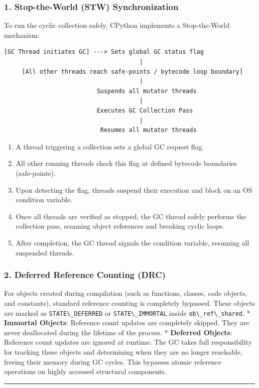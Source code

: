\hypertarget{stop-the-world-stw-synchronization}{%
\subsubsection{1. Stop-the-World (STW)
Synchronization}\label{stop-the-world-stw-synchronization}}

To run the cyclic collection safely, CPython implements a Stop-the-World
mechanism:

\begin{lstlisting}
[GC Thread initiates GC] ---> Sets global GC status flag
                                      |
     [All other threads reach safe-points / bytecode loop boundary]
                                      |
                          Suspends all mutator threads
                                      |
                          Executes GC Collection Pass
                                      |
                           Resumes all mutator threads
\end{lstlisting}

\begin{enumerate}
\def\labelenumi{\arabic{enumi}.}
\tightlist
\item
  A thread triggering a collection sets a global GC request flag.
\item
  All other running threads check this flag at defined bytecode
  boundaries (safe-points).
\item
  Upon detecting the flag, threads suspend their execution and block on
  an OS condition variable.
\item
  Once all threads are verified as stopped, the GC thread safely
  performs the collection pass, scanning object references and breaking
  cyclic loops.
\item
  After completion, the GC thread signals the condition variable,
  resuming all suspended threads.
\end{enumerate}

\hypertarget{deferred-reference-counting-drc}{%
\subsubsection{2. Deferred Reference Counting
(DRC)}\label{deferred-reference-counting-drc}}

For objects created during compilation (such as functions, classes, code
objects, and constants), standard reference counting is completely
bypassed. These objects are marked as
\passthrough{\lstinline!STATE\_DEFERRED!} or
\passthrough{\lstinline!STATE\_IMMORTAL!} inside
\passthrough{\lstinline!ob\_ref\_shared!}. * \textbf{Immortal Objects}:
Reference count updates are completely skipped. They are never
deallocated during the lifetime of the process. * \textbf{Deferred
Objects}: Reference count updates are ignored at runtime. The GC takes
full responsibility for tracking these objects and determining when they
are no longer reachable, freeing their memory during GC cycles. This
bypasses atomic reference operations on highly accessed structural
components.

\begin{center}\rule{0.5\linewidth}{0.5pt}\end{center}
